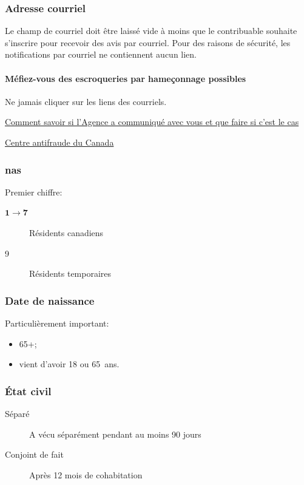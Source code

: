 \subsubsection{Adresse courriel}
Le champ de courriel doit être laissé vide à moins que le contribuable souhaite s'inscrire pour recevoir des avis par courriel. Pour des raisons de sécurité, les notifications par courriel ne contiennent aucun lien.
\paragraph{Méfiez-vous des escroqueries par hameçonnage possibles}

Ne jamais cliquer sur les liens des courriels.

\cat\href{https://www.canada.ca/fr/agence-revenu/nouvelles/salle-presse/conseils-fiscaux/conseils-fiscaux-2021/comment-savoir-si-lagence-a-communique-avec-vous-et-que-faire-si-cest-le-cas.html}{Comment savoir si l'Agence a communiqué avec vous et que faire si c'est le cas}

\cat\href{https://antifraudcentre-centreantifraude.ca/}{Centre antifraude du Canada}

\subsubsection{\acrfull{nas}}
Premier chiffre:
\begin{description}
	\item[$\boldsymbol{1 \rightarrow 7}$] Résidents canadiens
	\item[9] Résidents temporaires
\end{description}

\subsubsection{Date de naissance}
Particulièrement important:
\begin{itemize}
	\item 65+;
	\item vient d'avoir 18 ou 65~ans.
\end{itemize}

\subsubsection{État civil}
\begin{description}
	\item[Séparé] A vécu séparément pendant au moins 90 jours
	\item[Conjoint de fait] Après 12 mois de cohabitation
\end{description}

